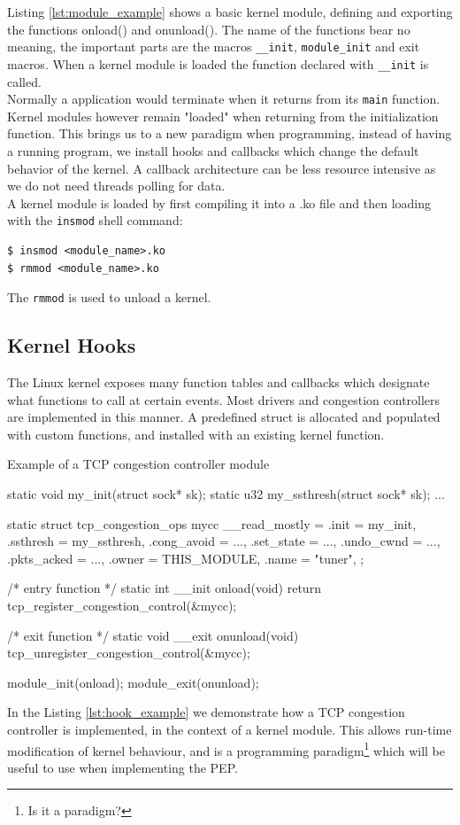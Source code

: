 \documentclass[a4paper,english, 11pt]{report}
\begin{document}
Listing \ref{lst:module_example} shows a basic kernel module, defining and exporting the functions onload() and onunload(). The name of the functions bear no meaning, the important parts are the macros \verb|__init|, \verb|module_init| and exit macros\cite{lkm}. When a kernel module is loaded the function declared with \verb|__init| is called.\\

Normally a application would terminate when it returns from its \verb|main| function. Kernel modules however remain "loaded" when returning from the initialization function. This brings us to a new paradigm when programming, instead of having a running program, we install hooks and callbacks which change the default behavior of the kernel. A callback architecture can be less resource intensive as we do not need threads polling for data.\\

A kernel module is loaded by first compiling it into a .ko file and then loading with the \verb|insmod| shell command:
\begin{verbatim}
$ insmod <module_name>.ko
$ rmmod <module_name>.ko
\end{verbatim}
The \verb|rmmod| is used to unload a kernel. 

\subsection{Kernel Hooks}
The Linux kernel exposes many function tables and callbacks which designate what functions to call at certain events. Most drivers and congestion controllers are implemented in this manner. A predefined struct is allocated and populated with custom functions, and installed with an existing kernel function.

\begin{autonumlstlisting}[label=lst:hook_example]{Example of a TCP congestion controller module}

static void my_init(struct sock* sk);
static u32 my_ssthresh(struct sock* sk);
...

static struct tcp_congestion_ops mycc __read_mostly = {
  .init           = my_init,
  .ssthresh       = my_ssthresh,
  .cong_avoid     = ...,
  .set_state      = ...,
  .undo_cwnd      = ...,
  .pkts_acked     = ...,
  .owner          = THIS_MODULE,
  .name           = "tuner",
};

/* entry function */
static int __init onload(void) {
    return tcp_register_congestion_control(&mycc);
}

/* exit function */
static void __exit onunload(void) {
    tcp_unregister_congestion_control(&mycc);
}

module_init(onload);
module_exit(onunload);
\end{autonumlstlisting}
In the Listing \ref{lst:hook_example} we demonstrate how a TCP congestion controller is implemented, in the context of a kernel module. This allows run-time modification of kernel behaviour, and is a programming paradigm\footnote{Is it a paradigm?} which will be useful to use when implementing the PEP.
\end{document}
